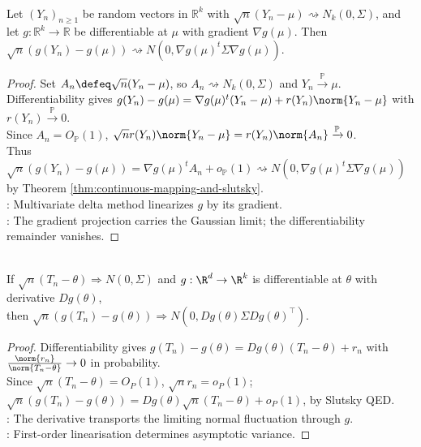 \begin{theorem} \label{thm:delta-method-multivariate} \\
Let $(Y_n)_{n\geq1}$ be random vectors in $\mathbb{R}^k$ with $\sqrt{n}(Y_n-\mu)\rightsquigarrow N_k(0,\Sigma)$, and let $g:\mathbb{R}^k\to\mathbb{R}$ be differentiable at $\mu$ with gradient $\nabla g(\mu)$. Then $\sqrt{n}(g(Y_n)-g(\mu))\rightsquigarrow N(0,\nabla g(\mu)^t\Sigma\nabla g(\mu))$.
\begin{proof} Set $A_n\defeq\sqrt{n}(Y_n-\mu)$, so $A_n\rightsquigarrow N_k(0,\Sigma)$ and $Y_n\xrightarrow{\mathbb{P}}\mu$.\\
Differentiability gives $g(Y_n)-g(\mu)=\nabla g(\mu)^t(Y_n-\mu)+r(Y_n)\norm{Y_n-\mu}$ with $r(Y_n)\xrightarrow{\mathbb{P}}0$.\\
Since $A_n=O_{\mathbb{P}}(1)$, $\sqrt{n}r(Y_n)\norm{Y_n-\mu}=r(Y_n)\norm{A_n}\xrightarrow{\mathbb{P}}0$.\\
Thus $\sqrt{n}(g(Y_n)-g(\mu))=\nabla g(\mu)^tA_n+o_{\mathbb{P}}(1)\rightsquigarrow N(0,\nabla g(\mu)^t\Sigma\nabla g(\mu))$ by Theorem \ref{thm:continuous-mapping-and-slutsky}.\\
: Multivariate delta method linearizes $g$ by its gradient.\\
: The gradient projection carries the Gaussian limit; the differentiability remainder vanishes.
\end{proof}
\end{theorem}

\begin{proposition} \label{prop:delta-method} \\
If $\sqrt{n}(T_n-\theta)\Rightarrow N(0,\Sigma)$ and $g:\R^d\to\R^k$ is differentiable at $\theta$ with derivative $Dg(\theta)$,\\
then $\sqrt{n}(g(T_n)-g(\theta))\Rightarrow N(0,Dg(\theta)\Sigma Dg(\theta)^\top)$.
\begin{proof}
Differentiability gives $g(T_n)-g(\theta)=Dg(\theta)(T_n-\theta)+r_n$ with $\frac{\norm{r_n}}{\norm{T_n-\theta}}\to0$ in probability.\\
Since $\sqrt{n}(T_n-\theta)=O_P(1)$, $\sqrt{n}r_n=o_P(1)$; $\sqrt{n}(g(T_n)-g(\theta))=Dg(\theta)\sqrt{n}(T_n-\theta)+o_P(1)$, by Slutsky QED.\\
: The derivative transports the limiting normal fluctuation through $g$.\\
: First-order linearisation determines asymptotic variance.
\end{proof}
\end{proposition}

